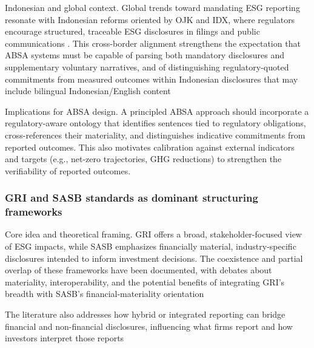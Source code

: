 Indonesian and global context. Global trends toward mandating ESG reporting resonate with Indonesian reforms oriented by OJK and IDX, where regulators encourage structured, traceable ESG disclosures in filings and public communications \cite{10.22617/tcs210472-2,10.1108/mf-01-2023-0020,10.1007/s40804-021-00233-z} . This cross-border alignment strengthens the expectation that ABSA systems must be capable of parsing both mandatory disclosures and supplementary voluntary narratives, and of distinguishing regulatory-quoted commitments from measured outcomes within Indonesian disclosures that may include bilingual Indonesian/English content \cite{10.22617/tcs210472-2,10.1108/mf-01-2023-0020,10.1007/s40804-021-00233-z,10.1016/j.inffus.2025.103073,10.1111/eufm.12509}

Implications for ABSA design. A principled ABSA approach should incorporate a regulatory-aware ontology that identifies sentences tied to regulatory obligations, cross-references their materiality, and distinguishes indicative commitments from reported outcomes. This also motivates calibration against external indicators and targets (e.g., net-zero trajectories, GHG reductions) to strengthen the verifiability of reported outcomes.

\subsubsection{GRI and SASB standards as dominant structuring frameworks}

Core idea and theoretical framing. GRI offers a broad, stakeholder-focused view of ESG impacts, while SASB emphasizes financially material, industry-specific disclosures intended to inform investment decisions. The coexistence and partial overlap of these frameworks have been documented, with debates about materiality, interoperability, and the potential benefits of integrating GRI's breadth with SASB's financial-materiality orientation \cite{10.1108/medar-11-2021-1486,10.1007/978-3-319-04723-2_7,10.1002/bse.2657,10.3390/su11041093,10.1111/ablj.12148,10.1108/ijlma-06-2022-0113}

The literature also addresses how hybrid or integrated reporting can bridge financial and non-financial disclosures, influencing what firms report and how investors interpret those reports \cite{10.3390/su15032610,10.46647/ijetms.2023.v07i01.006}

